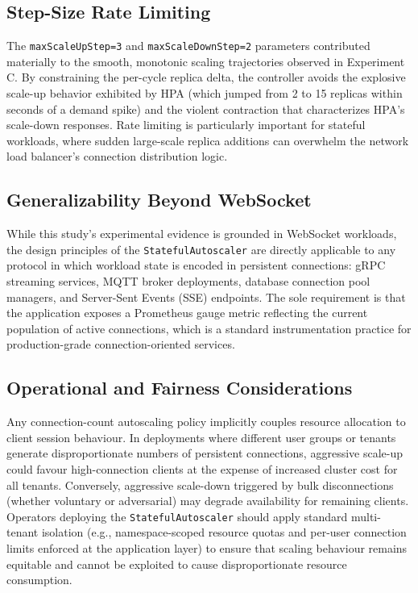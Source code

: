 \documentclass[twocolumn]{svjour3}
\begin{document}
\subsection{Step-Size Rate Limiting}

The \texttt{maxScaleUpStep=3} and \texttt{maxScaleDownStep=2} parameters contributed materially to the smooth, monotonic scaling trajectories observed in Experiment C. By constraining the per-cycle replica delta, the controller avoids the explosive scale-up behavior exhibited by HPA (which jumped from 2 to 15 replicas within seconds of a demand spike) and the violent contraction that characterizes HPA's scale-down responses. Rate limiting is particularly important for stateful workloads, where sudden large-scale replica additions can overwhelm the network load balancer's connection distribution logic.

\subsection{Generalizability Beyond WebSocket}

While this study's experimental evidence is grounded in WebSocket workloads, the design principles of the \texttt{StatefulAutoscaler} are directly applicable to any protocol in which workload state is encoded in persistent connections: gRPC streaming services, MQTT broker deployments, database connection pool managers, and Server-Sent Events (SSE) endpoints. The sole requirement is that the application exposes a Prometheus gauge metric reflecting the current population of active connections, which is a standard instrumentation practice for production-grade connection-oriented services.

\subsection{Operational and Fairness Considerations}

Any connection-count autoscaling policy implicitly couples resource allocation to client session behaviour. In deployments where different user groups or tenants generate disproportionate numbers of persistent connections, aggressive scale-up could favour high-connection clients at the expense of increased cluster cost for all tenants. Conversely, aggressive scale-down triggered by bulk disconnections (whether voluntary or adversarial) may degrade availability for remaining clients. Operators deploying the \texttt{StatefulAutoscaler} should apply standard multi-tenant isolation (e.g., namespace-scoped resource quotas and per-user connection limits enforced at the application layer) to ensure that scaling behaviour remains equitable and cannot be exploited to cause disproportionate resource consumption.
\end{document}

